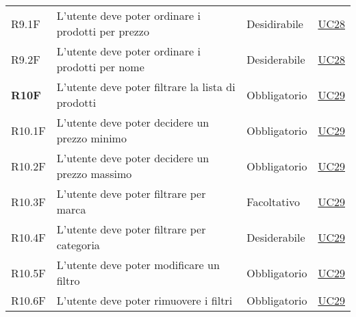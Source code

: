 \begin{center}
\begin{longtable}[!h]{p{50px} p{245px} p{75px} p{50px}}
        R9.1F                                 & L'utente deve poter ordinare i prodotti per prezzo                                                                                                     & Desidirabile             & \hyperref[sec:UC28]{UC28}                    \\
        R9.2F                                 & L'utente deve poter ordinare i prodotti per nome                                                                                                       & Desiderabile             & \hyperref[sec:UC28]{UC28}                    \\
        \textbf{R10F}                         & L'utente deve poter filtrare la lista di prodotti                                                                                                      & Obbligatorio             & \hyperref[sec:UC29]{UC29}                    \\
        R10.1F                                & L'utente deve poter decidere un prezzo minimo                                                                                                          & Obbligatorio             & \hyperref[sec:UC29]{UC29}                    \\
        R10.2F                                & L'utente deve poter decidere un prezzo massimo                                                                                                         & Obbligatorio             & \hyperref[sec:UC29]{UC29}                    \\
        R10.3F                                & L'utente deve poter filtrare per marca                                                                                                                 & Facoltativo              & \hyperref[sec:UC29]{UC29}                    \\
        R10.4F                                & L'utente deve poter filtrare per categoria                                                                                                             & Desiderabile             & \hyperref[sec:UC29]{UC29}                    \\
        R10.5F                                & L'utente deve poter modificare un filtro                                                                                                               & Obbligatorio             & \hyperref[sec:UC29]{UC29}                    \\
        R10.6F                                & L'utente deve poter rimuovere i filtri                                                                                                                 & Obbligatorio             & \hyperref[sec:UC29]{UC29}                    \\

\end{longtable}
\end{center}
